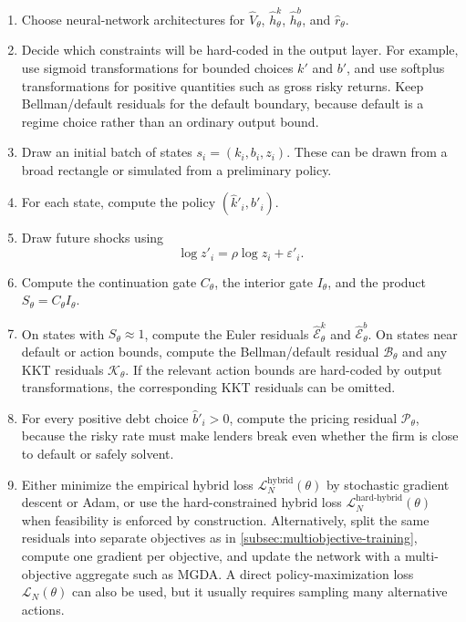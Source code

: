 \documentclass[11pt]{article}
\newcommand{\1}{\mathbf{1}}
\begin{document}
\begin{enumerate}[leftmargin=2em]
  \item Choose neural-network architectures for
  \(\widehat V_\theta\), \(\widehat h^k_\theta\), \(\widehat h^b_\theta\), and
  \(\widehat r_\theta\).

  \item Decide which constraints will be hard-coded in the output layer. For
  example, use sigmoid transformations for bounded choices \(k'\) and \(b'\),
  and use softplus transformations for positive quantities such as gross risky
  returns. Keep Bellman/default residuals for the default boundary, because
  default is a regime choice rather than an ordinary output bound.

  \item Draw an initial batch of states \(s_i=(k_i,b_i,z_i)\). These can be
  drawn from a broad rectangle or simulated from a preliminary policy.

  \item For each state, compute the policy
  \((\widehat k'_i,\widehat b'_i)\).

  \item Draw future shocks using
  \[
    \log z'_i=\rho\log z_i+\varepsilon'_i.
  \]

  \item Compute the continuation gate \(C_\theta\), the interior gate
  \(I_\theta\), and the product \(S_\theta=C_\theta I_\theta\).

  \item On states with \(S_\theta\approx 1\), compute the Euler residuals
  \(\widehat{\mathcal E}^k_\theta\) and
  \(\widehat{\mathcal E}^b_\theta\). On states near default or action bounds,
  compute the Bellman/default residual \(\mathcal B_\theta\) and any KKT
  residuals \(\mathcal K_\theta\). If the relevant action bounds are
  hard-coded by output transformations, the corresponding KKT residuals can be
  omitted.

  \item For every positive debt choice \(\widehat b'_i>0\), compute the pricing
  residual \(\mathcal P_\theta\), because the risky rate must make lenders break
  even whether the firm is close to default or safely solvent.

  \item Either minimize the empirical hybrid loss
  \(\mathcal L_N^{\mathrm{hybrid}}(\theta)\) by stochastic gradient descent or
  Adam, or use the hard-constrained hybrid loss
  \(\mathcal L_N^{\mathrm{hard\text{-}hybrid}}(\theta)\) when feasibility is
  enforced by construction. Alternatively, split the same residuals into
  separate objectives as in \cref{subsec:multiobjective-training}, compute one
  gradient per objective, and update the network with a multi-objective
  aggregate such as MGDA. A direct policy-maximization loss
  \(\mathcal L_N(\theta)\) can also be used, but it usually requires sampling
  many alternative actions.


\end{enumerate}
\end{document}
